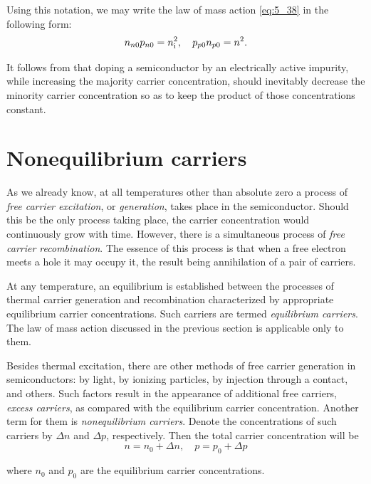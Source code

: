 Using this notation, we may write the law of mass action \eqref{eq:5_38} in the following form:
\begin{equation}\label{eq:5_44}
    n_{n0} p_{n0} = n_{\text{i}}^2,\quad p_{p0} n_{p0} = n^2.
\end{equation}

\noindent
It follows from  that doping a semiconductor by an electrically active impurity, while increasing the majority carrier concentration, should inevitably decrease the minority carrier concentration so as to keep the product of those concentrations constant.

\section{Nonequilibrium carriers}\label{sec:46}

As we already know, at all temperatures other than absolute zero a process of \textit{free carrier excitation}, or \textit{generation}, takes place in the semiconductor. Should this be the only process taking place, the carrier concentration would continuously grow with time. However, there is a simultaneous process of \textit{free carrier recombination}. The essence of this process is that when a free electron meets a hole it may occupy it, the result being annihilation of a pair of carriers.

At any temperature, an equilibrium is established between the processes of thermal carrier generation and recombination characterized by appropriate equilibrium carrier concentrations. Such carriers are termed \textit{equilibrium carriers}. The law of mass action discussed in the previous section is applicable only to them.

Besides thermal excitation, there are other methods of free carrier generation in semiconductors: by light, by ionizing particles, by injection through a contact, and others. Such factors result in the appearance of additional free carriers, \textit{excess carriers}, as compared with the equilibrium carrier concentration. Another term for them is \textit{nonequilibrium carriers}. Denote the concentrations of such carriers by $\Delta{n}$ and $\Delta{p}$, respectively. Then the total carrier concentration will be
\begin{equation}\label{eq:5_45}
    n = n_0 + \Delta{n},\quad p = p_0 + \Delta{p}
\end{equation}

\noindent
where $n_0$ and $p_0$ are the equilibrium carrier concentrations.

